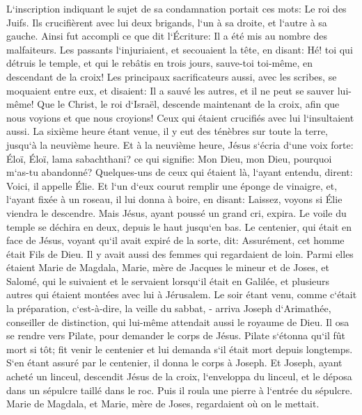 \verse L`inscription indiquant le sujet de sa condamnation portait ces mots: Le roi des Juifs. 
\verse Ils crucifièrent avec lui deux brigands, l`un à sa droite, et l`autre à sa gauche. 
\verse Ainsi fut accompli ce que dit l`Écriture: Il a été mis au nombre des malfaiteurs. 
\verse Les passants l`injuriaient, et secouaient la tête, en disant: Hé! toi qui détruis le temple, et qui le rebâtis en trois jours, 
\verse sauve-toi toi-même, en descendant de la croix! 
\verse Les principaux sacrificateurs aussi, avec les scribes, se moquaient entre eux, et disaient: Il a sauvé les autres, et il ne peut se sauver lui-même! 
\verse Que le Christ, le roi d`Israël, descende maintenant de la croix, afin que nous voyions et que nous croyions! Ceux qui étaient crucifiés avec lui l`insultaient aussi. 
\verse La sixième heure étant venue, il y eut des ténèbres sur toute la terre, jusqu`à la neuvième heure. 
\verse Et à la neuvième heure, Jésus s`écria d`une voix forte: Éloï, Éloï, lama sabachthani? ce qui signifie: Mon Dieu, mon Dieu, pourquoi m`as-tu abandonné? 
\verse Quelques-uns de ceux qui étaient là, l`ayant entendu, dirent: Voici, il appelle Élie. 
\verse Et l`un d`eux courut remplir une éponge de vinaigre, et, l`ayant fixée à un roseau, il lui donna à boire, en disant: Laissez, voyons si Élie viendra le descendre. 
\verse Mais Jésus, ayant poussé un grand cri, expira. 
\verse Le voile du temple se déchira en deux, depuis le haut jusqu`en bas. 
\verse Le centenier, qui était en face de Jésus, voyant qu`il avait expiré de la sorte, dit: Assurément, cet homme était Fils de Dieu. 
\verse Il y avait aussi des femmes qui regardaient de loin. Parmi elles étaient Marie de Magdala, Marie, mère de Jacques le mineur et de Joses, et Salomé, 
\verse qui le suivaient et le servaient lorsqu`il était en Galilée, et plusieurs autres qui étaient montées avec lui à Jérusalem. 
\verse Le soir étant venu, comme c`était la préparation, c`est-à-dire, la veille du sabbat, - 
\verse arriva Joseph d`Arimathée, conseiller de distinction, qui lui-même attendait aussi le royaume de Dieu. Il osa se rendre vers Pilate, pour demander le corps de Jésus. 
\verse Pilate s`étonna qu`il fût mort si tôt; fit venir le centenier et lui demanda s`il était mort depuis longtemps. 
\verse S`en étant assuré par le centenier, il donna le corps à Joseph. 
\verse Et Joseph, ayant acheté un linceul, descendit Jésus de la croix, l`enveloppa du linceul, et le déposa dans un sépulcre taillé dans le roc. Puis il roula une pierre à l`entrée du sépulcre. 
\verse Marie de Magdala, et Marie, mère de Joses, regardaient où on le mettait. 

